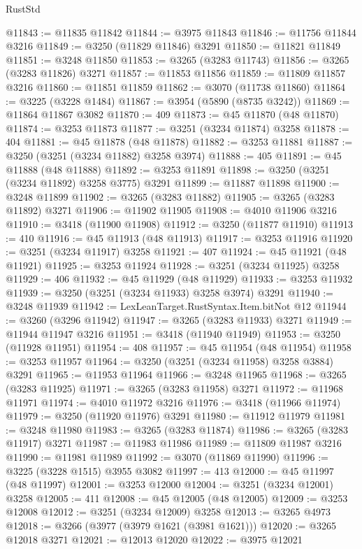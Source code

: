 \begin{lexlean}{RustStd}
\begin{coremodule}
@11843 := @11835 @11842
@11844 := @3975 @11843
@11846 := @11756 @11844 @3216
@11849 := @3250 (@11829 @11846) @3291
@11850 := @11821 @11849
@11851 := @3248 @11850
@11853 := @3265 (@3283 @11743)
@11856 := @3265 (@3283 @11826) @3271
@11857 := @11853 @11856
@11859 := @11809 @11857 @3216
@11860 := @11851 @11859
@11862 := @3070 (@11738 @11860)
@11864 := @3225 (@3228 @1484)
@11867 := @3954 (@5890 (@8735 @3242))
@11869 := @11864 @11867 @3082
@11870 := 409
@11873 := @45 @11870 (@48 @11870)
@11874 := @3253 @11873
@11877 := @3251 (@3234 @11874) @3258
@11878 := 404
@11881 := @45 @11878 (@48 @11878)
@11882 := @3253 @11881
@11887 := @3250 (@3251 (@3234 @11882) @3258 @3974)
@11888 := 405
@11891 := @45 @11888 (@48 @11888)
@11892 := @3253 @11891
@11898 := @3250 (@3251 (@3234 @11892) @3258 @3775) @3291
@11899 := @11887 @11898
@11900 := @3248 @11899
@11902 := @3265 (@3283 @11882)
@11905 := @3265 (@3283 @11892) @3271
@11906 := @11902 @11905
@11908 := @4010 @11906 @3216
@11910 := @3418 (@11900 @11908)
@11912 := @3250 (@11877 @11910)
@11913 := 410
@11916 := @45 @11913 (@48 @11913)
@11917 := @3253 @11916
@11920 := @3251 (@3234 @11917) @3258
@11921 := 407
@11924 := @45 @11921 (@48 @11921)
@11925 := @3253 @11924
@11928 := @3251 (@3234 @11925) @3258
@11929 := 406
@11932 := @45 @11929 (@48 @11929)
@11933 := @3253 @11932
@11939 := @3250 (@3251 (@3234 @11933) @3258 @3974) @3291
@11940 := @3248 @11939
@11942 := LexLeanTarget.RustSyntax.Item.bitNot @12
@11944 := @3260 (@3296 @11942)
@11947 := @3265 (@3283 @11933) @3271
@11949 := @11944 @11947 @3216
@11951 := @3418 (@11940 @11949)
@11953 := @3250 (@11928 @11951)
@11954 := 408
@11957 := @45 @11954 (@48 @11954)
@11958 := @3253 @11957
@11964 := @3250 (@3251 (@3234 @11958) @3258 @3884) @3291
@11965 := @11953 @11964
@11966 := @3248 @11965
@11968 := @3265 (@3283 @11925)
@11971 := @3265 (@3283 @11958) @3271
@11972 := @11968 @11971
@11974 := @4010 @11972 @3216
@11976 := @3418 (@11966 @11974)
@11979 := @3250 (@11920 @11976) @3291
@11980 := @11912 @11979
@11981 := @3248 @11980
@11983 := @3265 (@3283 @11874)
@11986 := @3265 (@3283 @11917) @3271
@11987 := @11983 @11986
@11989 := @11809 @11987 @3216
@11990 := @11981 @11989
@11992 := @3070 (@11869 @11990)
@11996 := @3225 (@3228 @1515) @3955 @3082
@11997 := 413
@12000 := @45 @11997 (@48 @11997)
@12001 := @3253 @12000
@12004 := @3251 (@3234 @12001) @3258
@12005 := 411
@12008 := @45 @12005 (@48 @12005)
@12009 := @3253 @12008
@12012 := @3251 (@3234 @12009) @3258
@12013 := @3265 @4973
@12018 := @3266 (@3977 (@3979 @1621 (@3981 @1621)))
@12020 := @3265 @12018 @3271
@12021 := @12013 @12020
@12022 := @3975 @12021

\end{coremodule}
\end{lexlean}
